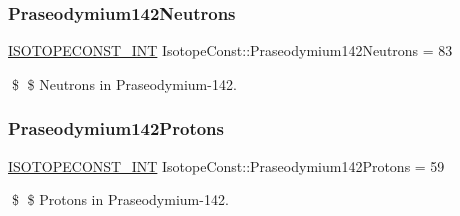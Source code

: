 \subsubsection{\texorpdfstring{Praseodymium142\+Neutrons}{Praseodymium142Neutrons}}
{\footnotesize\ttfamily \mbox{\hyperlink{group___isotope_const-_macros_ga5f18360b3e99483a35c32d789e62621c}{I\+S\+O\+T\+O\+P\+E\+C\+O\+N\+S\+T\+\_\+\+I\+NT}} Isotope\+Const\+::\+Praseodymium142\+Neutrons = 83}

\$ \$ Neutrons in Praseodymium-\/142. \mbox{\label{group___isotope_const-_praseodymium-_pr142_ga3cc236b22d15c9b313f349158d3e4d96}} 
\subsubsection{\texorpdfstring{Praseodymium142\+Protons}{Praseodymium142Protons}}
{\footnotesize\ttfamily \mbox{\hyperlink{group___isotope_const-_macros_ga5f18360b3e99483a35c32d789e62621c}{I\+S\+O\+T\+O\+P\+E\+C\+O\+N\+S\+T\+\_\+\+I\+NT}} Isotope\+Const\+::\+Praseodymium142\+Protons = 59}

\$ \$ Protons in Praseodymium-\/142. 